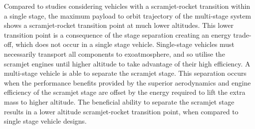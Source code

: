 \documentclass[journal]{new-aiaa}
\begin{document}
 
 Compared to studies considering vehicles with a scramjet-rocket transition within a single stage\cite{Lu1993}\cite{Trefny1999}, the maximum payload to orbit trajectory of the multi-stage system shows a scramjet-rocket transition point at much lower altitudes.
 This lower transition point is a consequence of the stage separation creating an energy trade-off, which does not occur in a single stage vehicle. Single-stage vehicles must necessarily transport all components to exoatmosphere, and so utilise the scramjet engines until higher altitude to take advantage of their high efficiency. A multi-stage vehicle is able to separate the scramjet stage. 
This separation occurs when the performance benefits provided by the superior aerodynamics and engine efficiency of the scramjet stage are offset by the energy required to lift the extra mass to higher altitude. The beneficial ability
to separate the scramjet stage results in a lower altitude scramjet-rocket transition point, when compared to single
stage vehicle designs.
\end{document}
